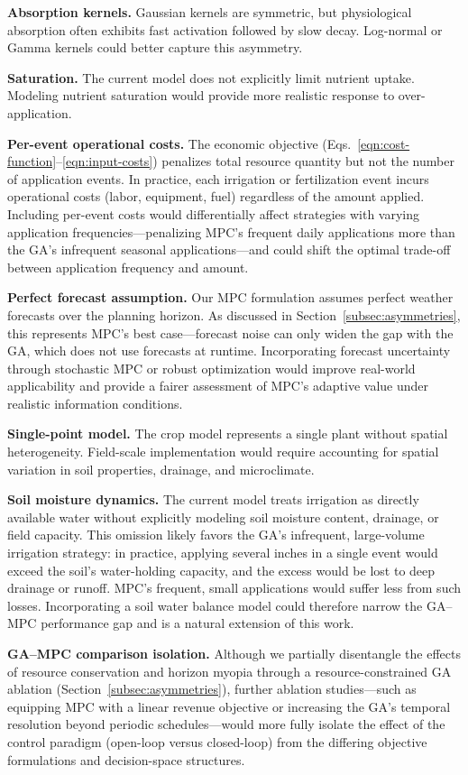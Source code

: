 \documentclass[pdflatex,sn-mathphys-num]{sn-jnl}
\begin{document}
\textbf{Absorption kernels.} Gaussian kernels are symmetric, but physiological absorption often exhibits fast activation followed by slow decay. Log-normal or Gamma kernels could better capture this asymmetry.

\textbf{Saturation.} The current model does not explicitly limit nutrient uptake. Modeling nutrient saturation would provide more realistic response to over-application.

\textbf{Per-event operational costs.} The economic objective (Eqs.~\ref{eqn:cost-function}--\ref{eqn:input-costs}) penalizes total resource quantity but not the number of application events. In practice, each irrigation or fertilization event incurs operational costs (labor, equipment, fuel) regardless of the amount applied. Including per-event costs would differentially affect strategies with varying application frequencies---penalizing MPC's frequent daily applications more than the GA's infrequent seasonal applications---and could shift the optimal trade-off between application frequency and amount.

\textbf{Perfect forecast assumption.} Our MPC formulation assumes perfect weather forecasts over the planning horizon. As discussed in Section~\ref{subsec:asymmetries}, this represents MPC's best case---forecast noise can only widen the gap with the GA, which does not use forecasts at runtime. Incorporating forecast uncertainty through stochastic MPC or robust optimization would improve real-world applicability and provide a fairer assessment of MPC's adaptive value under realistic information conditions.

\textbf{Single-point model.} The crop model represents a single plant without spatial heterogeneity. Field-scale implementation would require accounting for spatial variation in soil properties, drainage, and microclimate.

\textbf{Soil moisture dynamics.} The current model treats irrigation as directly available water without explicitly modeling soil moisture content, drainage, or field capacity. This omission likely favors the GA's infrequent, large-volume irrigation strategy: in practice, applying several inches in a single event would exceed the soil's water-holding capacity, and the excess would be lost to deep drainage or runoff. MPC's frequent, small applications would suffer less from such losses. Incorporating a soil water balance model could therefore narrow the GA--MPC performance gap and is a natural extension of this work.

\textbf{GA--MPC comparison isolation.} Although we partially disentangle the effects of resource conservation and horizon myopia through a resource-constrained GA ablation (Section~\ref{subsec:asymmetries}), further ablation studies---such as equipping MPC with a linear revenue objective or increasing the GA's temporal resolution beyond periodic schedules---would more fully isolate the effect of the control paradigm (open-loop versus closed-loop) from the differing objective formulations and decision-space structures.
\end{document}
